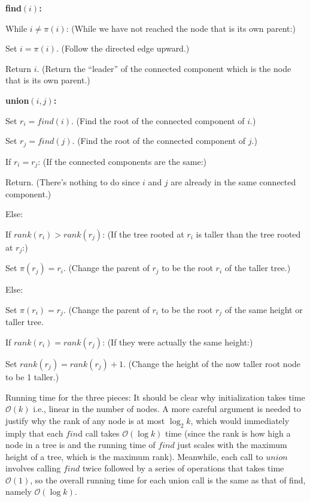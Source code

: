 \textbf{find$(i)$:}

\-\hspace{7mm} While $i\ne \pi (i)$: (While we have not reached the node that is its own parent:)
        
\-\hspace{12mm} Set $i=\pi(i)$. (Follow the directed edge upward.)
				
\-\hspace{7mm} Return $i$. (Return the ``leader'' of the connected component which is the node that is its own parent.)

\textbf{union$(i,j)$:}

\-\hspace{7mm} Set $r_i=find(i)$. (Find the root of the connected component of $i$.)

\-\hspace{7mm} Set $r_j=find(j)$. (Find the root of the connected component of $j$.)

\-\hspace{7mm} If $r_i=r_j$: (If the connected components are the same:)

\-\hspace{12mm} Return. (There's nothing to do since $i$ and $j$ are already in the same connected component.)

\-\hspace{7mm} Else:

\-\hspace{12mm} If $rank(r_i)>rank(r_j)$: (If the tree rooted at $r_i$ is taller than the tree rooted at $r_j$:)

\-\hspace{18mm} Set $\pi(r_j)=r_i$. (Change the parent of $r_j$ to be the root $r_i$ of the taller tree.)

\-\hspace{12mm} Else:

\-\hspace{18mm} Set $\pi(r_i)=r_j$. (Change the parent of $r_i$ to be the root $r_j$ of the same height or taller tree.

\-\hspace{18mm} If $rank(r_i)=rank(r_j)$: (If they were actually the same height:)

\-\hspace{24mm} Set $rank(r_j)=rank(r_j)+1$. (Change the height of the now taller root node to be 1 taller.)

Running time for the three pieces: It should be clear why initialization takes time $\mathcal{O}(k)$ i.e., linear in the number of nodes. A more careful argument is needed to justify why the rank of any node is at most $\log_2 k$, which would immediately imply that each $fin$d call takes $\mathcal{O}(\log k)$ time (since the rank is how high a node in a tree is and the running time of $find$ just scales with the maximum height of a tree, which is the maximum rank). Meanwhile, each call to $union$ involves calling $find$ twice followed by a series of operations that takes time $\mathcal{O}(1)$, so the overall running time for each union call is the same as that of find, namely $\mathcal{O}(\log k)$.

